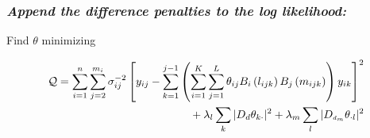 \documentclass[12pt]{beamer}
\newcommand{\ms}{\scriptscriptstyle}
\begin{document}
\begin{frame}
\frametitle{\emph{Append the difference penalties to the log likelihood:}}

Find $\theta$ minimizing

\begin{align*}\label{eq:unfolded-row-column-difference-penalty}
\mathcal{Q}=\sum_{i=1}^n \sum_{j=2}^{m_i} \sigma_{ij}^{-2} \left[y_{ij} - \sum_{k=1}^{j-1}\left(\sum_{i=1}^K \sum_{j=1}^L \theta_{ij} B_{i}\left(l_{ijk}\right) B_{j}\left( m_{ijk} \right)  \right) y_{ik} \right]^2 \\
\mbox{\;\;\;\;\;\;\;\;}+ \lambda_l \sum_{k} \vert D_d \theta_{k \cdot} \vert^2 + \lambda_m \sum_{l} \vert D_{\ms d_{\ms m}} \theta_{\cdot l} \vert^2 
\end{align*}

\end{frame}
%
\end{document}
